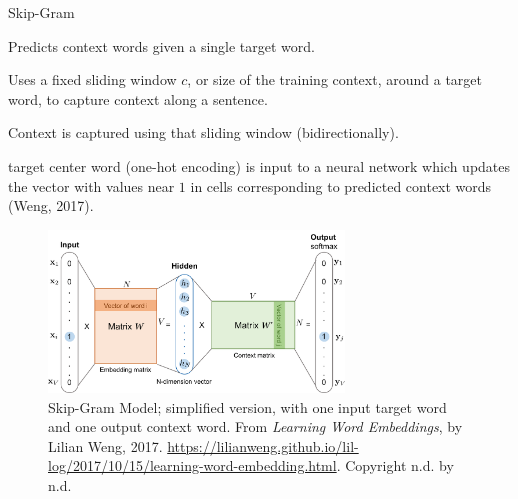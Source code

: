 \begin{frame}{Skip-Gram}\label{SkipGram}
    
    \begin{itemizeSpaced}{5pt}
        \pinkbox  Predicts context words given a single target word. 
        
        \pinkbox Uses a fixed sliding window $c$, or size of the training context, around a target word, to capture context along a sentence. 
        
        \item Context is captured using that sliding window (bidirectionally). 
        
        \item target center word (one-hot encoding) is input to a neural network which updates the vector with values near $1$ in cells corresponding to predicted context words (Weng, 2017).  
        
    \end{itemizeSpaced}
    
    
    \begin{figure}[h]
    \vspace{-15pt}
    \centering
    \includegraphics[width=0.7\textwidth]{imgs/skipgram_image.png}
    \vspace{-5pt}
    \caption{\tiny Skip-Gram Model; simplified version, with one input target word and one output context word. From \emph{Learning Word Embeddings}, by Lilian Weng, 2017. \url{https://lilianweng.github.io/lil-log/2017/10/15/learning-word-embedding.html}. Copyright n.d. by n.d.}
    \label{fig:SkipGram}
    \vspace{-5pt}
    \end{figure}
    
\end{frame}


